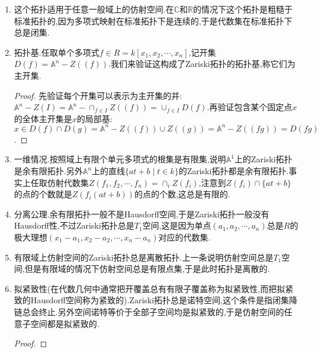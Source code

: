 \begin{enumerate}
\begin{enumerate}
\begin{proof}
    		\qquad
    		
    		验证有限并:设$\alpha_1,\alpha_2$是$R$的两个理想,那么有$Z(\alpha_1)\cup Z(\alpha_2)=Z(\alpha_1\alpha_2)$.一方面从$\alpha_1\alpha_2\subset\alpha_1\cap\alpha_2$得到$Z(\alpha_1)\cup Z(\alpha_2)\subseteq Z(\alpha_1\alpha_2)$;另一方面假设仿射空间中的点$x\not\in Z(\alpha_1)\cup Z(\alpha_2)$,那么存在$f\in\alpha_1$和$g\in\alpha_2$均不以$x$为零点,于是$fg\in\alpha_1\alpha_2$也不以$x$为零点.
    		
    		\qquad
    		
    		验证任意交:设$\{\alpha_i,i\in I\}$是$R$中的一族理想,那么有$\cap_iZ(\alpha_i)=Z(\sum_i\alpha_i)$.一方面从$\alpha_i\subset\sum_i\alpha_i,\forall i\in I$得到$Z(\sum_i\alpha_i)\subset\cap_iZ(\alpha_i)$;另一方面任取$x\in\cap_iZ(\alpha_i)$,那么$x$自然是$\sum_i\alpha_i$中每个多项式的零点.
    	\end{proof}
    	\item 这个拓扑适用于任意一般域上的仿射空间.在$\mathbb{C}$和$\mathbb{R}$的情况下这个拓扑是粗糙于标准拓扑的,因为多项式映射在标准拓扑下是连续的,于是代数集在标准拓扑下总是闭集.
    	\item 拓扑基.任取单个多项式$f\in R=k[x_1,x_2,\cdots,x_n]$,记开集$D(f)=\mathbb{A}^n-Z((f))$.我们来验证这构成了Zariski拓扑的拓扑基,称它们为主开集.
    	\begin{proof}
    		
    		先验证每个开集可以表示为主开集的并:$\mathbb{A}^n-Z(I)=\mathbb{A}^n-\cap_{f\in I}Z((f))=\cup_{f\in I}D(f)$.再验证包含某个固定点$x$的全体主开集是$x$的局部基:$x\in D(f)\cap D(g)=\mathbb{A}^n-Z((f))\cup Z((g))=\mathbb{A}^n-Z((fg))=D(fg)$.
    	\end{proof}
    	\item 一维情况.按照域上有限个单元多项式的根集是有限集,说明$\mathbb{A}^1$上的Zariski拓扑是余有限拓扑.另外$\mathbb{A}^n$上的直线$\{at+b\mid t\in k\}$的Zariski拓扑都是余有限拓扑.事实上任取仿射代数集$Z(f_1,f_2,\cdots,f_n)=\cap_iZ(f_i)$,注意到$Z(f_i)\cap\{at+b\}$的点的个数就是$Z(f_i(at+b))$的点的个数,这总是有限的.
    	\item 分离公理.余有限拓扑一般不是Hausdorff空间,于是Zariski拓扑一般没有Hausdorff性,不过Zariski拓扑总是$T_1$空间,这是因为单点$(a_1,a_2,\cdots,a_n)$总是$R$的极大理想$(x_1-a_1,x_2-a_2,\cdots,x_n-a_n)$对应的代数集.
    	\item 有限域上仿射空间的Zariski拓扑总是离散拓扑.上一条说明仿射空间总是$T_1$空间,但是有限域的情况下仿射空间总是有限点集,于是此时拓扑是离散的.
    	\item 拟紧致性(在代数几何中通常把开覆盖总有有限子覆盖称为拟紧致性,而把拟紧致的Hausdorff空间称为紧致的).Zariski拓扑总是诺特空间,这个条件是指闭集降链总会终止.另外空间诺特等价于全部子空间均是拟紧致的,于是仿射空间的任意子空间都是拟紧致的.
    	\begin{proof}
    		

\end{proof}
\end{enumerate}
\end{enumerate}
